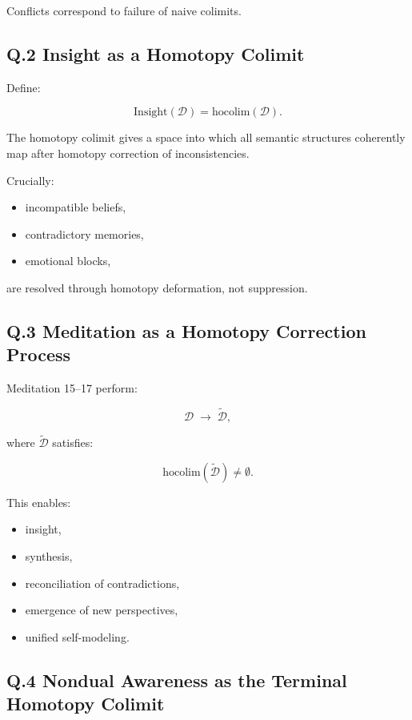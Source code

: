 \documentclass[12pt]{article}
\begin{document}
Conflicts correspond to failure of naive colimits.

\subsection*{Q.2 Insight as a Homotopy Colimit}

Define:

\[
\mathrm{Insight}(\mathcal{D})
=
\mathrm{hocolim}(\mathcal{D}).
\]

The homotopy colimit gives a space into which all semantic structures coherently
map after homotopy correction of inconsistencies.

Crucially:

\begin{itemize}
    \item incompatible beliefs,
    \item contradictory memories,
    \item emotional blocks,
\end{itemize}

are resolved through homotopy deformation, not suppression.

\subsection*{Q.3 Meditation as a Homotopy Correction Process}

Meditation 15–17 perform:

\[
\mathcal{D} \;\to\; \widetilde{\mathcal{D}},
\]

where $\widetilde{\mathcal{D}}$ satisfies:

\[
\mathrm{hocolim}(\widetilde{\mathcal{D}}) \neq \emptyset.
\]

This enables:

\begin{itemize}
    \item insight,
    \item synthesis,
    \item reconciliation of contradictions,
    \item emergence of new perspectives,
    \item unified self-modeling.
\end{itemize}

\subsection*{Q.4 Nondual Awareness as the Terminal Homotopy Colimit}
\end{document}
